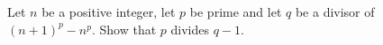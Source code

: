 Let $n$ be a positive integer, let $p$ be prime and let $q$ be a divisor of $(n + 1)^p - n^p$. Show that $p$ divides $q - 1$.